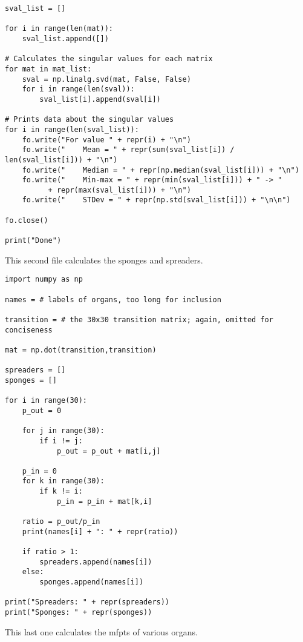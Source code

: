 \documentclass[letterpaper,12pt]{article}
\begin{document}
\begin{verbatim}
sval_list = []

for i in range(len(mat)):
    sval_list.append([])

# Calculates the singular values for each matrix
for mat in mat_list:
    sval = np.linalg.svd(mat, False, False)
    for i in range(len(sval)):
        sval_list[i].append(sval[i])

# Prints data about the singular values
for i in range(len(sval_list)):
    fo.write("For value " + repr(i) + "\n")
    fo.write("    Mean = " + repr(sum(sval_list[i]) / len(sval_list[i])) + "\n")
    fo.write("    Median = " + repr(np.median(sval_list[i])) + "\n")
    fo.write("    Min-max = " + repr(min(sval_list[i])) + " -> "
          + repr(max(sval_list[i])) + "\n")
    fo.write("    STDev = " + repr(np.std(sval_list[i])) + "\n\n")

fo.close()

print("Done")

\end{verbatim}

\pagebreak

This second file calculates the sponges and spreaders.

\begin{verbatim}
import numpy as np

names = # labels of organs, too long for inclusion

transition = # the 30x30 transition matrix; again, omitted for conciseness

mat = np.dot(transition,transition)

spreaders = []
sponges = []

for i in range(30):
    p_out = 0

    for j in range(30):
        if i != j:
            p_out = p_out + mat[i,j]

    p_in = 0
    for k in range(30):
        if k != i:
            p_in = p_in + mat[k,i]

    ratio = p_out/p_in
    print(names[i] + ": " + repr(ratio))
    
    if ratio > 1:
        spreaders.append(names[i])
    else:
        sponges.append(names[i])

print("Spreaders: " + repr(spreaders))
print("Sponges: " + repr(sponges))
\end{verbatim}

\pagebreak

This last one calculates the mfpts of various organs.
\end{document}
